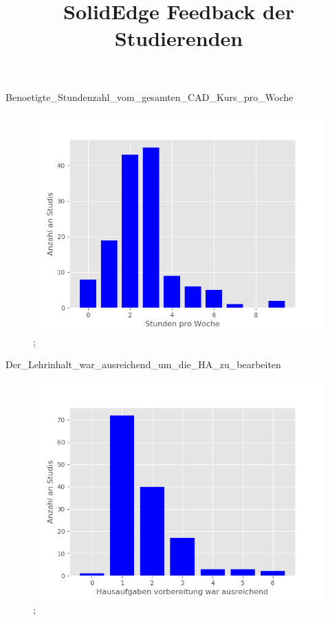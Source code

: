 \documentclass[10pt]{beamer}
\title{SolidEdge Feedback der Studierenden}
\begin{document}
 
     \maketitle 
\begin{frame}[fragile]{Benoetigte_Stundenzahl_vom_gesamten_CAD_Kurs_pro_Woche} 
 \begin{figure}
 \includegraphics[width= 0.9\linewidth]{./PDFcreater/Plots/Benoetigte_Stundenzahl_vom_gesamten_CAD_Kurs_pro_Woche.png};
 \end{figure}
 \end{frame}
\begin{frame}[fragile]{Der_Lehrinhalt_war_ausreichend_um_die_HA_zu_bearbeiten} 
 \begin{figure}
 \includegraphics[width= 0.9\linewidth]{./PDFcreater/Plots/Der_Lehrinhalt_war_ausreichend_um_die_HA_zu_bearbeiten.png};
 \end{figure}
 \end{frame}
\end{document}
